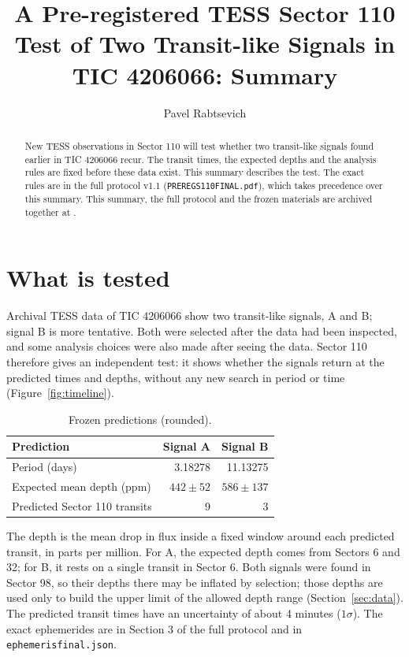 \documentclass{aastex702}
\newcommand{\code}[1]{\texttt{#1}}
\renewcommand{\_}{\origunderscore\allowbreak}
\begin{document}
\title{A Pre-registered TESS Sector 110 Test of Two Transit-like Signals in TIC 4206066: Summary}

\author[gname=Pavel,sname=Rabtsevich]{Pavel Rabtsevich}

\begin{abstract}
New TESS observations in Sector 110 will test whether two transit-like signals found earlier in TIC 4206066 recur.
The transit times, the expected depths and the analysis rules are fixed before these data exist. This summary
describes the test. The exact rules are in the full protocol v1.1 (\mbox{\code{PREREG\_S110\_FINAL.pdf}}), which
takes precedence over this summary. This summary, the full protocol and the frozen materials are archived together
at .
\end{abstract}


\section{What is tested}

Archival TESS data of TIC 4206066 show two transit-like signals, A and B; signal B is more tentative. Both were
selected after the data had been inspected, and some analysis choices were also made after seeing the data. Sector 110
therefore gives an independent test: it shows whether the signals return at the predicted times and depths, without
any new search in period or time (Figure~\ref{fig:timeline}).

\begin{table}[ht]
\centering
\caption{Frozen predictions (rounded).\label{tab:pred}}
\begin{tabular}{@{}lrr@{}}
\toprule
Prediction & Signal A & Signal B \\
\midrule
Period (days) & 3.18278 & 11.13275 \\
Expected mean depth (ppm) & $442\pm52$ & $586\pm137$ \\
Predicted Sector 110 transits & 9 & 3 \\
\bottomrule
\end{tabular}
\end{table}

The depth is the mean drop in flux inside a fixed window around each predicted transit, in parts per million. For A,
the expected depth comes from Sectors 6 and 32; for B, it rests on a single transit in Sector 6. Both signals were
found in Sector 98, so their depths there may be inflated by selection; those depths are used only to build the upper
limit of the allowed depth range (Section~\ref{sec:data}). The predicted transit times have an uncertainty of about 4 minutes ($1\sigma$). The exact
ephemerides are in Section 3 of the full protocol and in \code{ephemeris\_final.json}.
\end{document}
